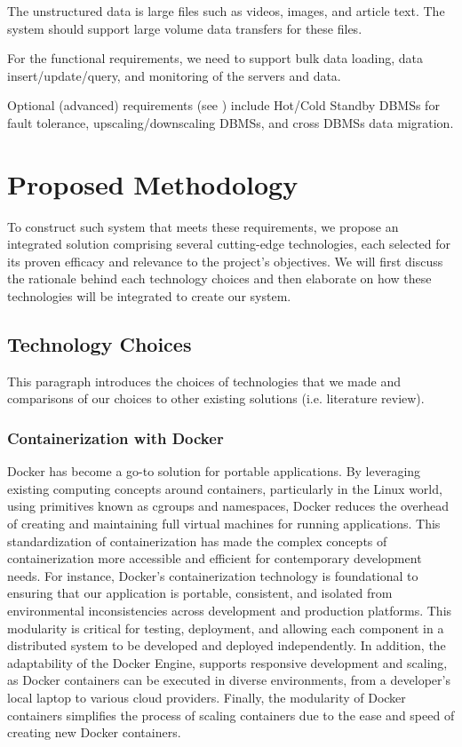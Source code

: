 \documentclass{report}
\begin{document}
    The unstructured data is large files such as videos, images, and article text. The system should support large volume data transfers for these files.

    For the functional requirements, we need to support bulk data loading, data insert/update/query, and monitoring of the servers and data.

    Optional (advanced) requirements (see ) include Hot/Cold Standby DBMSs for fault tolerance, upscaling/downscaling DBMSs, and cross DBMSs data migration.

    \section{Proposed Methodology}
    To construct such system that meets these requirements, we propose an integrated solution comprising several cutting-edge technologies, each selected for its proven efficacy and relevance to the project's objectives. We will first discuss the rationale behind each technology choices and then elaborate on how these technologies will be integrated to create our system.

    \subsection{Technology Choices}\label{subsec:technology-choices}
    This paragraph introduces the choices of technologies that we made and comparisons of our choices to other existing solutions (i.e. literature review).

    \subsubsection{Containerization with Docker}
    Docker has become a go-to solution for portable applications. By leveraging existing computing concepts around containers, particularly in the Linux world, using primitives known as cgroups and namespaces, Docker reduces the overhead of creating and maintaining full virtual machines for running applications. This standardization of containerization has made the complex concepts of containerization more accessible and efficient for contemporary development needs. For instance, Docker's containerization technology is foundational to ensuring that our application is portable, consistent, and isolated from environmental inconsistencies across development and production platforms. This modularity is critical for testing, deployment, and allowing each component in a distributed system to be developed and deployed independently. In addition, the adaptability of the Docker Engine, supports responsive development and scaling, as Docker containers can be executed in diverse environments, from a developer's local laptop to various cloud providers. Finally, the modularity of Docker containers simplifies the process of scaling containers due to the ease and speed of creating new Docker containers.
\end{document}
